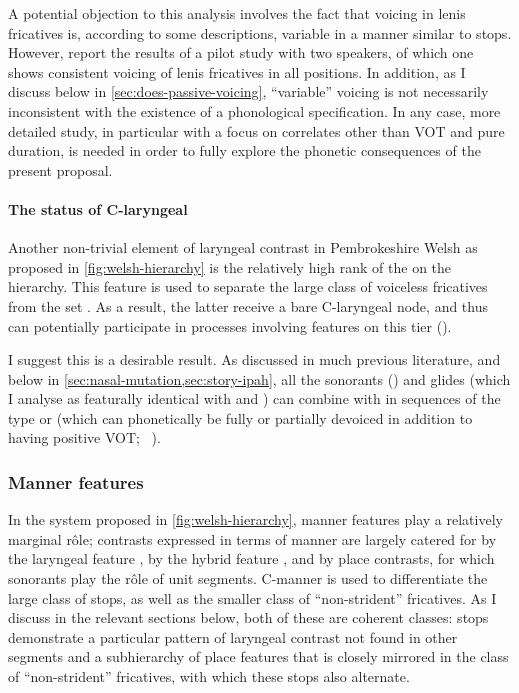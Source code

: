 A potential objection to this analysis involves the fact that voicing in lenis fricatives is, according to some descriptions, variable in a manner similar to stops. However, \citet{ball01:_welsh_phonet} report the results of a pilot study with two speakers, of which one shows consistent voicing of lenis fricatives in all positions. In addition, as I discuss below in \cref{sec:does-passive-voicing}, \enquote{variable} voicing is not necessarily inconsistent with the existence of a phonological specification. In any case, more detailed study, in particular with a focus on correlates other than VOT and pure duration, is needed in order to fully explore the phonetic consequences of the present proposal.

\paragraph{The status of C-laryngeal}
\label{sec:status-c-laryngeal}

Another non-trivial element of laryngeal contrast in Pembrokeshire Welsh as proposed in \cref{fig:welsh-hierarchy} is the relatively high rank of the  on the hierarchy. This feature is used to separate the large class of voiceless fricatives from the set \ipa{[m~ŋ~n~l~r~i~u]}. As a result, the latter receive a bare C-laryngeal node, and thus can potentially participate in processes involving features on this tier (\ie {}).

I suggest this is a desirable result. As discussed in much previous literature, and below in \cref{sec:nasal-mutation,sec:story-ipah}, all the sonorants (\ipa{[m~ŋ~n~l~r]}) and glides \ipa{[w j]} (which I analyse as featurally identical with \ipa{[u]} and ) can combine with \ipa{[h]} in sequences of the type \ipa{[nh]} or \ipa{[wh]} (which can phonetically be fully or partially devoiced in addition to having positive VOT; \eg\ \citealt{ball-phon}).

\subsubsection{Manner features}
\label{sec:manner-features}

In the system proposed in \cref{fig:welsh-hierarchy}, manner features play a relatively marginal rôle; contrasts expressed in terms of manner are largely catered for by the laryngeal feature , by the hybrid feature , and by place contrasts, for which sonorants play the rôle of unit segments. C-manner is used to differentiate the large class of stops, as well as the smaller class of \enquote{non-strident} fricatives. As I discuss in the relevant sections below, both of these are coherent classes: stops demonstrate a particular pattern of laryngeal contrast not found in other segments and a subhierarchy of place features that is closely mirrored in the class of \enquote{non\hyp strident} fricatives, with which these stops also alternate.

